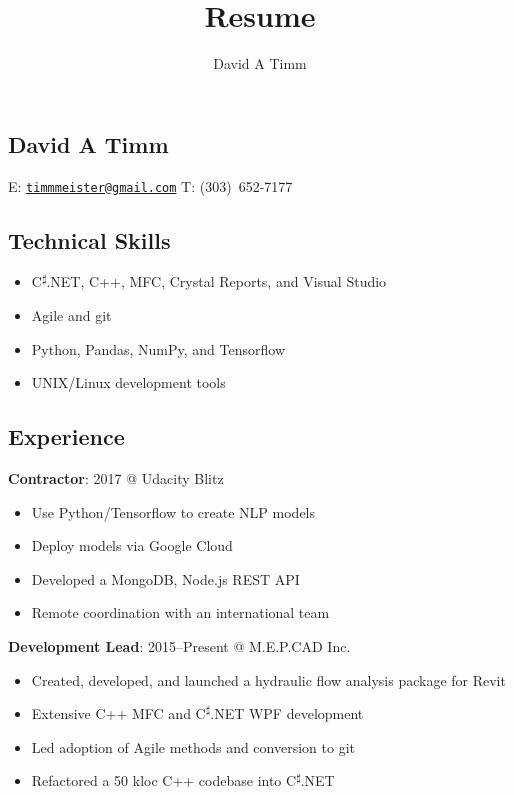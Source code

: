 \documentclass[letterpaper,12pt]{article}
\author{David A Timm}
\title{Resume}
\begin{document}
\begin{center}
\section{David A Timm}

E: \href{mailto:timmmeister@gmail.com?subject=You%27re%20hired!}
{\nolinkurl{timmmeister@gmail.com}}
T: \mbox{(303) 652-7177}
\end{center}

\begin{center}
\subsection{Technical Skills}
\end{center}

\begin{itemize}
\item C\textsuperscript{{$\sharp$}}.NET, C++, MFC, Crystal Reports, and Visual Studio
\item Agile and git
\item Python, Pandas, NumPy, and Tensorflow
\item UNIX/Linux development tools
\end{itemize}

\begin{center}
\subsection{Experience}
\end{center}

\begin{flushleft}
\textbf{Contractor}: 2017 @ Udacity Blitz
\end{flushleft}

\begin{itemize}
\item Use Python/Tensorflow to create NLP models
\item Deploy models via Google Cloud
\item Developed a MongoDB, Node.js REST API
\item Remote coordination with an international team
\end{itemize}

\begin{flushleft}
\textbf{Development Lead}: 2015--Present @ M.E.P.CAD Inc.
\end{flushleft}

\begin{itemize}
\item Created, developed, and launched a hydraulic flow analysis package for Revit
\item Extensive C++ MFC and C\textsuperscript{{$\sharp$}}.NET WPF development
\item Led adoption of Agile methods and conversion to git
\item Refactored a 50 kloc C++ codebase into C\textsuperscript{{$\sharp$}}.NET
\end{itemize}
\end{document}
